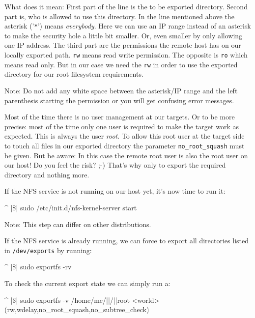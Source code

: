 What does it mean: First part of the line is the to be exported directory. Second part is,
who is allowed to use this directory. In the line mentioned above the asterisk ('\texttt{*}')
means \textit{everybody}. Here we can use an IP range instead of an asterisk to make the
security hole a little bit smaller. Or, even smaller by only allowing one IP address.
The third part are the permissions the remote host has
on our locally exported path. \texttt{rw} means read write permission. The opposite is
\texttt{ro} which means read only. But in our case we need the \texttt{rw} in order to use
the exported directory for our root filesystem requirements.

Note: Do not add any white space between the asterisk/IP range and the left parenthesis
starting the permission or you will get confusing error messages.

Most of the time there is no user management at our targets. Or to be more precise: most of
the time only one user is required to make the target work as expected. This is always the
user \textit{root}. To allow this root user at the target side to touch all files in our exported
directory the parameter \texttt{no\_root\_squash} must be given. But be aware: In this
case the remote root user is also the root user on our host! Do you feel the risk? ;-) That's why
only to export the required directory and nothing more.

If the NFS service is not running on our host yet, it's now time to run it:

\begin{ptxshell}[escapechar=|]{^}
|\$| sudo /etc/init.d/nfs-kernel-server start
\end{ptxshell}

Note: This step can differ on other distributions.

If the NFS service is already running, we can force to export all directories listed in
\texttt{/dev/exports} by running:

\begin{ptxshell}[escapechar=|]{^}
|\$| sudo exportfs -rv
\end{ptxshell}

To check the current export state we can simply run a:

\begin{ptxshell}[escapechar=|]{^}
|\$| sudo exportfs -v
/home/me/|\ptxdistBSPName |/|\ptxdistPlatformDir |root
	<world>(rw,wdelay,no_root_squash,no_subtree_check)
\end{ptxshell}

